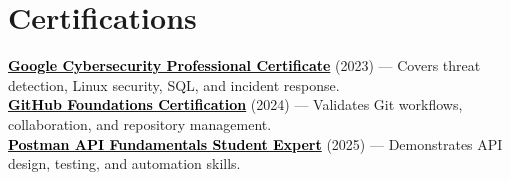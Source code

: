 \documentclass[a4paper]{article}
\begin{document}
\section{Certifications}
 \begin{itemize}[leftmargin=0.15in, label={}]
    \small{\item{
    \href{https://coursera.org/share/44fd8f381cb39ac45892569cdf6f7674}{\textcolor{black}{\textbf{Google Cybersecurity Professional Certificate}}} (2023) --- Covers threat detection, Linux security, SQL, and incident response. \\
    \href{https://www.credly.com/badges/d5c30c19-02db-4c5f-9bc9-4bd0f4b6a89e/public_url}{\textcolor{black}{\textbf{GitHub Foundations Certification}}} (2024) --- Validates Git workflows, collaboration, and repository management. \\
    \href{https://badges.parchment.com/public/assertions/ZF0yx-i3T1CvXYwDLEUneA?identity__email=sakib.sadman.badhon\%40g.bracu.ac.bd}{\textcolor{black}{\textbf{Postman API Fundamentals Student Expert}}} (2025) --- Demonstrates API design, testing, and automation skills.
    }}
 \end{itemize}


\end{document}
